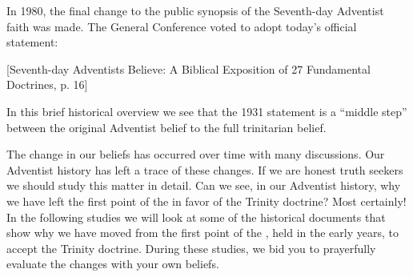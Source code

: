 In 1980, the final change to the public synopsis of the Seventh-day Adventist faith was made. The General Conference voted to adopt today’s official statement:

[Seventh-day Adventists Believe: A Biblical Exposition of 27 Fundamental Doctrines, p. 16]

In this brief historical overview we see that the 1931 statement is a “middle step” between the original Adventist belief to the full trinitarian belief. 

The change in our beliefs has occurred over time with many discussions. Our Adventist history has left a trace of these changes. If we are honest truth seekers we should study this matter in detail. Can we see, in our Adventist history, why we have left the first point of the  in favor of the Trinity doctrine? Most certainly! In the following studies we will look at some of the historical documents that show why we have moved from the first point of the , held in the early years, to accept the Trinity doctrine. During these studies, we bid you to prayerfully evaluate the changes with your own beliefs.

